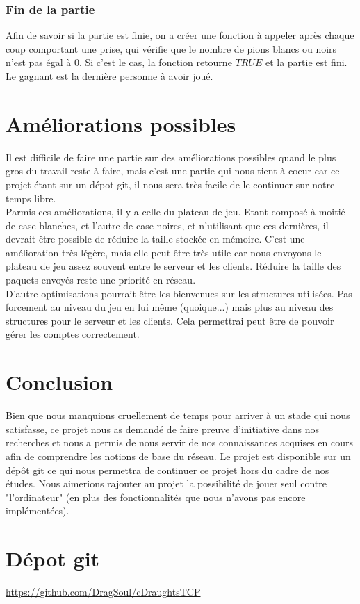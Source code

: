 \documentclass{article}
\begin{document}
        \begin{changemargin}{-2cm}{-2cm}
            
        \end{changemargin}


    \subsubsection{Fin de la partie}
        Afin de savoir si la partie est finie, on a créer une fonction à appeler après chaque coup comportant une prise, qui vérifie
        que le nombre de pions blancs ou noirs n'est pas égal à 0. Si c'est le cas, la fonction retourne $TRUE$ et la partie est fini.
        Le gagnant est la dernière personne à avoir joué.


    \section{Améliorations possibles}
        Il est difficile de faire une partie sur des améliorations possibles quand le plus gros du travail reste à faire,
        mais c'est une partie qui nous tient à coeur car ce projet étant sur un dépot git, il nous sera très facile de le continuer
        sur notre temps libre.\\
        Parmis ces améliorations, il y a celle du plateau de jeu. Etant composé à moitié de case blanches, et l'autre de case noires, et n'utilisant
        que ces dernières, il devrait être possible de réduire la taille stockée en mémoire. C'est une amélioration très légère, mais elle peut
        être très utile car nous envoyons le plateau de jeu assez souvent entre le serveur et les clients. Réduire la taille des paquets envoyés
        reste une priorité en réseau.\\
        D'autre optimisations pourrait être les bienvenues sur les structures utilisées. Pas forcement au niveau du jeu en lui même (quoique...)
        mais plus au niveau des structures pour le serveur et les clients. Cela permettrai peut être de pouvoir gérer les comptes correctement.

    \section{Conclusion}
        Bien que nous manquions cruellement de temps pour arriver à un stade qui nous satisfasse, ce projet nous as demandé de faire
        preuve d'initiative dans nos recherches et nous a permis de nous servir de nos connaissances acquises en cours afin de comprendre
        les notions de base du réseau. Le projet est disponible sur un dépôt git ce qui nous permettra de continuer ce projet hors du
        cadre de nos études. Nous aimerions rajouter au projet la possibilité de jouer seul contre "l'ordinateur" (en plus des fonctionnalités
        que nous n'avons pas encore implémentées).
    \section{Dépot git}
        \url{https://github.com/DragSoul/cDraughtsTCP}
\end{document}
